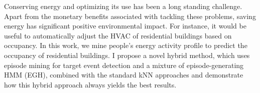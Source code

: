 Conserving energy and optimizing its use has been a long standing challenge. 
Apart from the monetary benefits associated with tackling these problems, saving energy has significant positive environmental impact. 
For instance, it would be useful to automatically adjust the HVAC of residential buildings based on occupancy.
In this work, we mine people's energy activity profile to predict the occupancy of residential buildings. I propose a novel hybrid method, which uses episode mining for target event  detection and a mixture of episode-generating HMM (EGH), 
combined with the standard kNN approaches and demonstrate how this hybrid approach always yields the best results.
